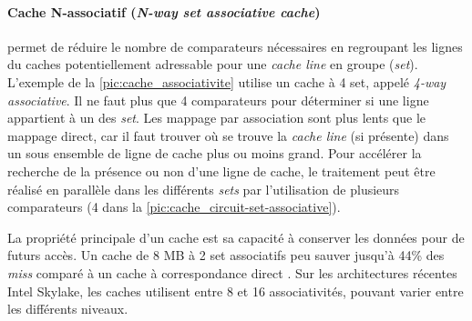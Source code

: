 \paragraph{Cache N-associatif (\textit{N-way set associative cache})} permet de réduire le nombre de comparateurs nécessaires en regroupant les lignes du caches potentiellement adressable pour une \textit{cache line} en groupe (\textit{set}). L'exemple de la \autoref{pic:cache_associativite} utilise un cache à 4 set, appelé \textit{4-way associative}. Il ne faut plus que 4 comparateurs pour déterminer si une ligne appartient à un des \textit{set}. Les mappage par association sont plus lents que le mappage direct, car il faut trouver où se trouve la \textit{cache line} (si présente) dans un sous ensemble de ligne de cache plus ou moins grand. Pour accélérer la recherche de la présence ou non d'une ligne de cache, le traitement peut être réalisé en parallèle dans les différents \textit{sets} par l'utilisation de plusieurs comparateurs (4 dans la \autoref{pic:cache_circuit-set-associative}). 

La propriété principale d'un cache est sa capacité à conserver les données pour de futurs accès. Un cache de 8 MB à 2 set associatifs peu sauver jusqu'à 44\% des \textit{miss} comparé à un cache à correspondance direct \cite{Drepper2007}. Sur les architectures récentes Intel Skylake, les caches utilisent entre 8 et 16 associativités, pouvant varier entre les différents niveaux. 

